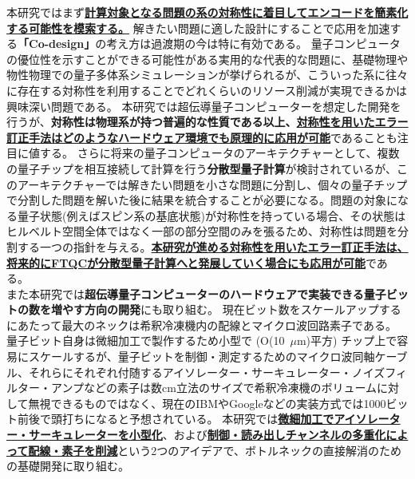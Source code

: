 \documentclass[11pt,a4j,dvipdfmx]{jarticle} 					%
\newcommand{\研究課題名}{誤り耐性量子コンピュータに向けた誤り訂正技術の開発(仮)}
\newcommand{\研究機関名}{東京大学}
\newcommand{\研究代表者氏名}{寺師弘二}
\newcommand{\研究期間の最終元号年度}{10}  %
\newcommand{\mybf}[1]{{\bfseries\sffamily#1}}
\begin{document}
本研究ではまず\mybf{\ul{計算対象となる問題の系の対称性に着目してエンコードを簡素化する可能性を模索する。}}
解きたい問題に適した設計にすることで応用を加速する\mybf{「Co-design」}の考え方は過渡期の今は特に有効である。
量子コンピュータの優位性を示すことができる可能性がある実用的な代表的な問題に、基礎物理や物性物理での量子多体系シミュレーションが挙げられるが、こういった系に往々に存在する対称性を利用することでどれくらいのリソース削減が実現できるかは興味深い問題である。
本研究では超伝導量子コンピューターを想定した開発を行うが、\mybf{対称性は物理系が持つ普遍的な性質である以上、\ul{対称性を用いたエラー訂正手法はどのようなハードウェア環境でも原理的に応用が可能}}であることも注目に値する。
さらに将来の量子コンピュータのアーキテクチャーとして、複数の量子チップを相互接続して計算を行う\mybf{分散型量子計算}が検討されているが、このアーキテクチャーでは解きたい問題を小さな問題に分割し、個々の量子チップで分割した問題を解いた後に結果を統合することが必要になる。問題の対象になる量子状態(例えばスピン系の基底状態)が対称性を持っている場合、その状態はヒルベルト空間全体ではなく一部の部分空間のみを張るため、対称性は問題を分割する一つの指針を与える。\mybf{\ul{本研究が進める対称性を用いたエラー訂正手法は、将来的にFTQCが分散型量子計算へと発展していく場合にも応用が可能}}である。\\

また本研究では\mybf{超伝導量子コンピューターのハードウェアで実装できる量子ビットの数を増やす方向の開発}にも取り組む。
現在ビット数をスケールアップするにあたって最大のネックは希釈冷凍機内の配線とマイクロ波回路素子である。
量子ビット自身は微細加工で製作するため小型で (O(10~$\mu \mathrm{m}$)平方) チップ上で容易にスケールするが、量子ビットを制御・測定するためのマイクロ波同軸ケーブル、それらにそれぞれ付随するアイソレーター・サーキュレーター・ノイズフィルター・アンプなどの素子は数cm立法のサイズで希釈冷凍機のボリュームに対して無視できるものではなく、現在のIBMやGoogleなどの実装方式では1000ビット前後で頭打ちになると予想されている。
本研究では\mybf{\ul{微細加工でアイソレーター・サーキュレーターを小型化}}、および\mybf{\ul{制御・読み出しチャンネルの多重化によって配線・素子を削減}}という2つのアイデアで、ボトルネックの直接解消のための基礎開発に取り組む。\\
\end{document}
